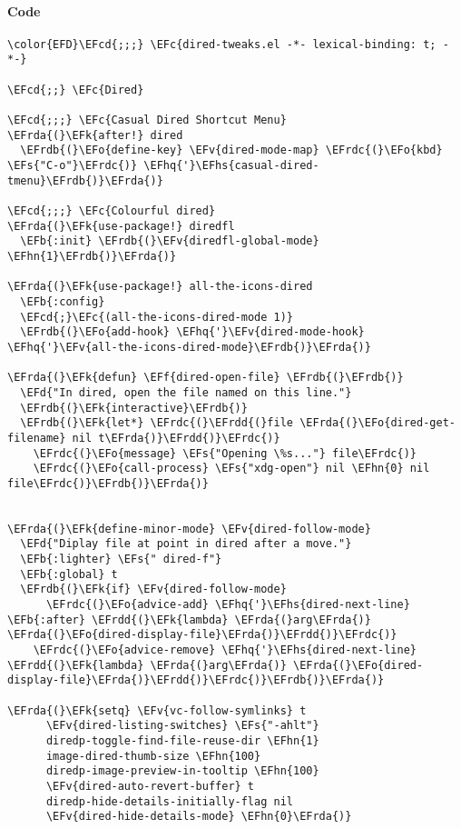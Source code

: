 \documentclass[a4wide,10pt]{article}
\newcommand{\EFc}[1]{\textcolor{EFc}{#1}} %
\newcommand{\EFcd}[1]{\textcolor{EFcd}{#1}} %
\newcommand{\EFs}[1]{\textcolor{EFs}{#1}} %
\newcommand{\EFd}[1]{\textcolor{EFd}{#1}} %
\newcommand{\EFk}[1]{\textcolor{EFk}{#1}} %
\newcommand{\EFb}[1]{\textcolor{EFb}{#1}} %
\newcommand{\EFf}[1]{\textcolor{EFf}{#1}} %
\newcommand{\EFv}[1]{\textcolor{EFv}{#1}} %
\newcommand{\EFo}[1]{\textcolor{EFo}{#1}} %
\newcommand{\EFhn}[1]{\textcolor{EFhn}{\textbf{#1}}} %
\newcommand{\EFhq}[1]{\textcolor{EFhq}{#1}} %
\newcommand{\EFhs}[1]{\textcolor{EFhs}{#1}} %
\newcommand{\EFrda}[1]{\textcolor{EFrda}{#1}} %
\newcommand{\EFrdb}[1]{\textcolor{EFrdb}{#1}} %
\newcommand{\EFrdc}[1]{\textcolor{EFrdc}{#1}} %
\newcommand{\EFrdd}[1]{\textcolor{EFrdd}{#1}} %
\begin{document}
\paragraph{Code}
\label{sec:org2d40f71}
\begin{Code}
\begin{Verbatim}
\color{EFD}\EFcd{;;;} \EFc{dired-tweaks.el -*- lexical-binding: t; -*-}

\EFcd{;;} \EFc{Dired}

\EFcd{;;;} \EFc{Casual Dired Shortcut Menu}
\EFrda{(}\EFk{after!} dired
  \EFrdb{(}\EFo{define-key} \EFv{dired-mode-map} \EFrdc{(}\EFo{kbd} \EFs{"C-o"}\EFrdc{)} \EFhq{'}\EFhs{casual-dired-tmenu}\EFrdb{)}\EFrda{)}

\EFcd{;;;} \EFc{Colourful dired}
\EFrda{(}\EFk{use-package!} diredfl
  \EFb{:init} \EFrdb{(}\EFv{diredfl-global-mode} \EFhn{1}\EFrdb{)}\EFrda{)}

\EFrda{(}\EFk{use-package!} all-the-icons-dired
  \EFb{:config}
  \EFcd{;}\EFc{(all-the-icons-dired-mode 1)}
  \EFrdb{(}\EFo{add-hook} \EFhq{'}\EFv{dired-mode-hook} \EFhq{'}\EFv{all-the-icons-dired-mode}\EFrdb{)}\EFrda{)}

\EFrda{(}\EFk{defun} \EFf{dired-open-file} \EFrdb{(}\EFrdb{)}
  \EFd{"In dired, open the file named on this line."}
  \EFrdb{(}\EFk{interactive}\EFrdb{)}
  \EFrdb{(}\EFk{let*} \EFrdc{(}\EFrdd{(}file \EFrda{(}\EFo{dired-get-filename} nil t\EFrda{)}\EFrdd{)}\EFrdc{)}
    \EFrdc{(}\EFo{message} \EFs{"Opening \%s..."} file\EFrdc{)}
    \EFrdc{(}\EFo{call-process} \EFs{"xdg-open"} nil \EFhn{0} nil file\EFrdc{)}\EFrdb{)}\EFrda{)}


\EFrda{(}\EFk{define-minor-mode} \EFv{dired-follow-mode}
  \EFd{"Diplay file at point in dired after a move."}
  \EFb{:lighter} \EFs{" dired-f"}
  \EFb{:global} t
  \EFrdb{(}\EFk{if} \EFv{dired-follow-mode}
      \EFrdc{(}\EFo{advice-add} \EFhq{'}\EFhs{dired-next-line} \EFb{:after} \EFrdd{(}\EFk{lambda} \EFrda{(}arg\EFrda{)} \EFrda{(}\EFo{dired-display-file}\EFrda{)}\EFrdd{)}\EFrdc{)}
    \EFrdc{(}\EFo{advice-remove} \EFhq{'}\EFhs{dired-next-line} \EFrdd{(}\EFk{lambda} \EFrda{(}arg\EFrda{)} \EFrda{(}\EFo{dired-display-file}\EFrda{)}\EFrdd{)}\EFrdc{)}\EFrdb{)}\EFrda{)}

\EFrda{(}\EFk{setq} \EFv{vc-follow-symlinks} t
      \EFv{dired-listing-switches} \EFs{"-ahlt"}
      diredp-toggle-find-file-reuse-dir \EFhn{1}
      image-dired-thumb-size \EFhn{100}
      diredp-image-preview-in-tooltip \EFhn{100}
      \EFv{dired-auto-revert-buffer} t
      diredp-hide-details-initially-flag nil
      \EFv{dired-hide-details-mode} \EFhn{0}\EFrda{)}


\end{Verbatim}
\end{Code}
\end{document}

